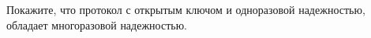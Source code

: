 Покажите, что протокол с открытым ключом и одноразовой надежностью, обладает многоразовой надежностью.
